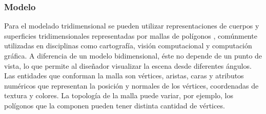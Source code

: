 \subsubsection{Modelo}
Para el modelado tridimensional se pueden utilizar representaciones de cuerpos y superficies tridimensionales representadas por mallas de polígonos \cite{Mesh_building}, comúnmente utilizadas en disciplinas como cartografía, visión computacional y computación gráfica. A diferencia de un modelo bidimensional, éste no depende de un punto de vista, lo que permite al diseñador visualizar la escena desde diferentes ángulos. Las entidades que conforman la malla son vértices, aristas, caras y atributos numéricos que representan la posición y normales de los vértices, coordenadas de textura y colores. La topología de la malla puede variar, por ejemplo, los polígonos que la componen pueden tener distinta cantidad de vértices.


